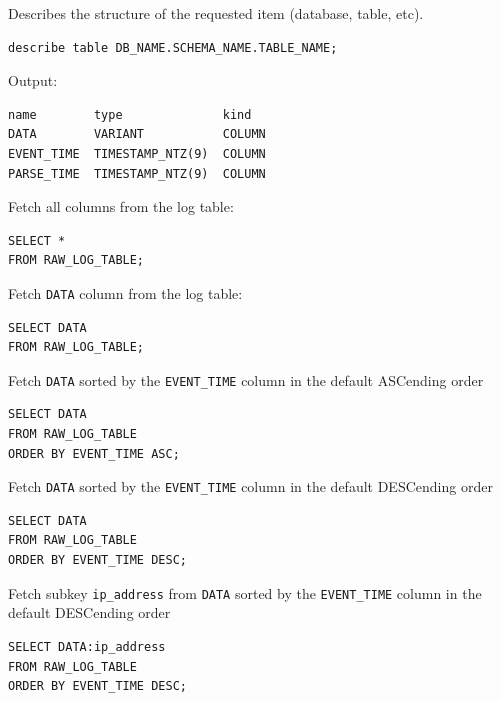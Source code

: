 \documentclass[9pt]{innovativeinnovation-cheatsheet}
\begin{document}
\begin{multicols}{3}
\small
Describes the structure of the requested item (database, table, etc).
\\[-18pt]
\begin{lstlisting}[style=code_style]
describe table DB_NAME.SCHEMA_NAME.TABLE_NAME;
\end{lstlisting}
Output:
\\[-18pt]
\begin{lstlisting}[style=code_style]
name        type              kind
DATA        VARIANT           COLUMN
EVENT_TIME  TIMESTAMP_NTZ(9)  COLUMN
PARSE_TIME  TIMESTAMP_NTZ(9)  COLUMN
\end{lstlisting}
\small
Fetch all columns from the log table:
\\[-18pt]
\begin{lstlisting}[style=code_style]
SELECT *
FROM RAW_LOG_TABLE;
\end{lstlisting}
\small
Fetch \texttt{DATA} column from the log table:
\\[-18pt]
\begin{lstlisting}[style=code_style]
SELECT DATA
FROM RAW_LOG_TABLE;
\end{lstlisting}
\small
Fetch \texttt{DATA} sorted by the \texttt{EVENT\_TIME} column in the default ASCending order
\\[-18pt]
\begin{lstlisting}[style=code_style]
SELECT DATA
FROM RAW_LOG_TABLE
ORDER BY EVENT_TIME ASC;
\end{lstlisting}
\small
Fetch \texttt{DATA} sorted by the \texttt{EVENT\_TIME} column in the default DESCending order
\\[-18pt]
\begin{lstlisting}[style=code_style]
SELECT DATA
FROM RAW_LOG_TABLE
ORDER BY EVENT_TIME DESC;
\end{lstlisting}
\small
Fetch subkey \texttt{ip\_address} from \texttt{DATA} sorted by the \texttt{EVENT\_TIME} column in the default DESCending order
\\[-18pt]
\begin{lstlisting}[style=code_style]
SELECT DATA:ip_address
FROM RAW_LOG_TABLE
ORDER BY EVENT_TIME DESC;
\end{lstlisting}


\end{multicols}
\end{document}
